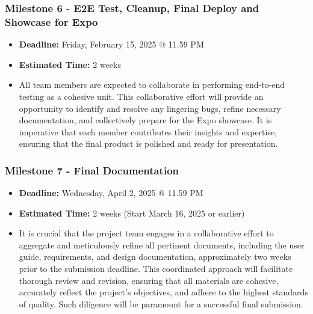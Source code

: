 \documentclass{article}
\begin{document}
\subsubsection*{Milestone 6 - E2E Test, Cleanup, Final Deploy and Showcase for Expo}
\begin{itemize}
    \item \textbf{Deadline:} Friday, February 15, 2025 @ 11.59 PM
    \item \textbf{Estimated Time:} 2 weeks
    \item All team members are expected to collaborate in performing end-to-end
    testing as a cohesive unit. This collaborative effort will provide an
    opportunity to identify and resolve any lingering bugs, refine necessary
    documentation, and collectively prepare for the Expo showcase. It is
    imperative that each member contributes their insights and expertise,
    ensuring that the final product is polished and ready for presentation.
\end{itemize}

\subsubsection*{Milestone 7 - Final Documentation}
\begin{itemize}
    \item \textbf{Deadline:} Wednesday, April 2, 2025 @ 11.59 PM
    \item \textbf{Estimated Time:} 2 weeks (Start March 16, 2025 or earlier)
    \item It is crucial that the project team engages in a collaborative effort
    to aggregate and meticulously refine all pertinent documents, including the
    user guide, requirements, and design documentation, approximately two weeks
    prior to the submission deadline. This coordinated approach will facilitate
    thorough review and revision, ensuring that all materials are cohesive,
    accurately reflect the project's objectives, and adhere to the highest
    standards of quality. Such diligence will be paramount for a successful
    final submission.
\end{itemize}

\newpage
\end{document}
